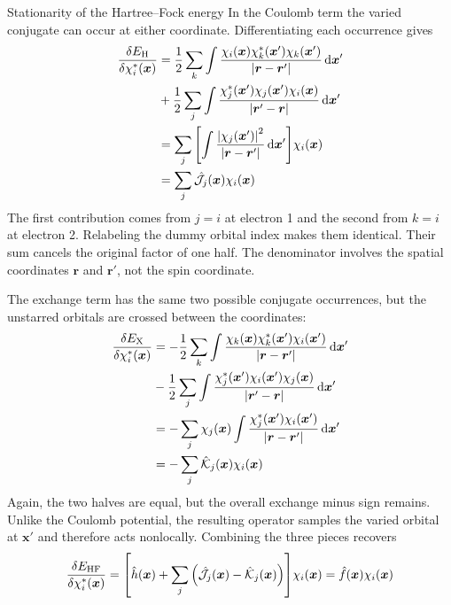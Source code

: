 \documentclass[11pt,a4paper,titlepage]{article}
\numberwithin{equation}{section}
\newcommand{\br}{\boldsymbol{r}}
\newcommand{\bx}{\boldsymbol{x}}
\newcommand{\hh}{\Hat{h}}
\newcommand{\hf}{\Hat{f}}
\newcommand{\chJ}{\Hat{\mathcal{J}}}
\newcommand{\chK}{\Hat{\mathcal{K}}}
\begin{document}
\begin{hfsolution}{Stationarity of the Hartree--Fock energy}
In the Coulomb term the varied conjugate can occur at either coordinate.
Differentiating each occurrence gives
\begin{equation}
\begin{split}
  \fdv{E_\text{H}}{\chi_i^*(\bx)}
  &=\frac12\sum_k\int
    \frac{\chi_i(\bx)\chi_k^*(\bx')\chi_k(\bx')}
      {\abs{\br-\br'}}\dd{\bx'}
  \\
  &+\frac12\sum_j\int
    \frac{\chi_j^*(\bx')\chi_j(\bx')\chi_i(\bx)}
      {\abs{\br'-\br}}\dd{\bx'}
  \\
  &=\sum_j\qty[\int
    \frac{\abs{\chi_j(\bx')}^2}{\abs{\br-\br'}}\dd{\bx'}]
    \chi_i(\bx)
  \\
  &=\sum_j\chJ_j(\bx)\chi_i(\bx)
\end{split}
\end{equation}
The first contribution comes from $j=i$ at electron 1 and the second from
$k=i$ at electron 2. Relabeling the dummy orbital index makes them identical.
Their sum cancels the original factor of one half. The denominator involves
the spatial coordinates $\br$ and $\br'$, not the spin coordinate.

The exchange term has the same two possible conjugate occurrences, but
the unstarred orbitals are crossed between the coordinates:
\begin{equation}
\begin{split}
  \fdv{E_\text{X}}{\chi_i^*(\bx)}
  &=-\frac12\sum_k\int
    \frac{\chi_k(\bx)\chi_k^*(\bx')\chi_i(\bx')}
      {\abs{\br-\br'}}\dd{\bx'}
  \\
  &-\frac12\sum_j\int
    \frac{\chi_j^*(\bx')\chi_i(\bx')\chi_j(\bx)}
      {\abs{\br'-\br}}\dd{\bx'}
  \\
  &=-\sum_j\chi_j(\bx)\int
    \frac{\chi_j^*(\bx')\chi_i(\bx')}
      {\abs{\br-\br'}}\dd{\bx'}
  \\
  &=-\sum_j\chK_j(\bx)\chi_i(\bx)
\end{split}
\end{equation}
Again, the two halves are equal, but the overall exchange minus sign remains.
Unlike the Coulomb potential, the resulting operator samples the varied
orbital at $\bx'$ and therefore acts nonlocally. Combining the three pieces
recovers
\begin{equation}
  \fdv{E_\text{HF}}{\chi_i^*(\bx)}
  =\qty[\hh(\bx)+\sum_j\qty(\chJ_j(\bx)-\chK_j(\bx))]
    \chi_i(\bx)
  =\hf(\bx)\chi_i(\bx)
\end{equation}


\end{hfsolution}
\end{document}
